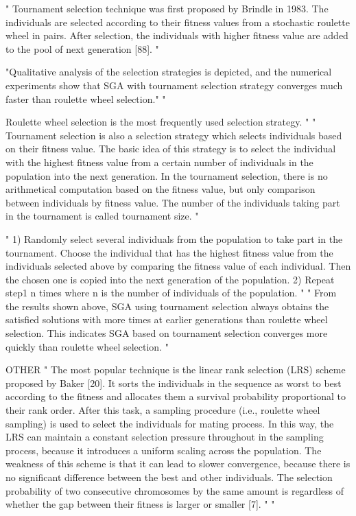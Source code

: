 "
Tournament selection technique was first proposed by Brindle in 1983. The individuals are selected according to their fitness values from a stochastic roulette wheel in pairs. After selection, the individuals with higher fitness value are added to the pool of next generation [88].
"\cite{katoch_review_2021}

"Qualitative analysis of the selection strategies is depicted, and the numerical experiments show that SGA with tournament selection strategy converges much faster than roulette wheel selection."
\cite{jinghui_zhong_comparison_2005}
"

Roulette wheel selection is the most frequently used selection strategy.
"\cite{jinghui_zhong_comparison_2005}
"
Tournament selection is also a selection strategy which selects individuals based on their fitness value. The basic idea of this strategy is to select the individual with the highest fitness value from a certain number of individuals in the population into the next generation. In the tournament selection, there is no arithmetical computation based on the fitness value, but only comparison between individuals by fitness value. The number of the individuals taking part in the tournament is called tournament size.
"\cite{jinghui_zhong_comparison_2005}

"
1) Randomly select several individuals from the population to take part in the tournament. Choose the individual that has the highest fitness value from the individuals selected above by comparing the fitness value of each individual. Then the chosen one is copied into the next generation of the population. 2) Repeat step1 n times where n is the number of individuals of the population.
"\cite{jinghui_zhong_comparison_2005}
"
From the results shown above, SGA using tournament selection always obtains the satisfied solutions with more times at earlier generations than roulette wheel selection. This indicates SGA based on tournament selection converges more quickly than roulette wheel selection.
"\cite{jinghui_zhong_comparison_2005}

OTHER
"
The most popular technique is the linear rank selection (LRS) scheme proposed by Baker [20]. It sorts the individuals in the sequence as worst to best according to the fitness and allocates them a survival probability proportional to their rank order. After this task, a sampling procedure (i.e., roulette wheel sampling) is used to select the individuals for mating process. In this way, the LRS can maintain a constant selection pressure throughout in the sampling process, because it introduces a uniform scaling across the population.
The weakness of this scheme is that it can lead to slower convergence, because there is no significant difference between the best and other individuals. The selection probability of two consecutive chromosomes by the same amount is regardless of whether the gap between their fitness is larger or smaller [7].
"\cite{hussain_trade-off_2020}
"



